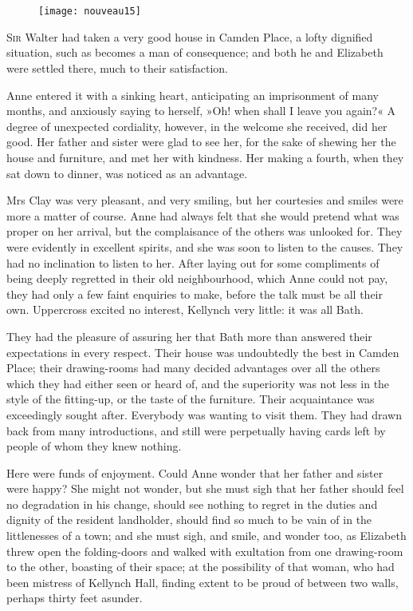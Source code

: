 \chapter[Chapter \thechapter]{}

\begin{figure}[t!]
\centering
\texttt{[image: nouveau15]}
\end{figure}

\lettrine[lines=4,lraise=0.3]{S}{ir} Walter had taken a very good house in Camden Place, a lofty dignified situation, such as becomes a man of consequence; and both he and Elizabeth were settled there, much to their satisfaction.

Anne entered it with a sinking heart, anticipating an imprisonment of many months, and anxiously saying to herself, »Oh! when shall I leave you again?« A degree of unexpected cordiality, however, in the welcome she received, did her good. Her father and sister were glad to see her, for the sake of shewing her the house and furniture, and met her with kindness. Her making a fourth, when they sat down to dinner, was noticed as an advantage.

Mrs Clay was very pleasant, and very smiling, but her courtesies and smiles were more a matter of course. Anne had always felt that she would pretend what was proper on her arrival, but the complaisance of the others was unlooked for. They were evidently in excellent spirits, and she was soon to listen to the causes. They had no inclination to listen to her. After laying out for some compliments of being deeply regretted in their old neighbourhood, which Anne could not pay, they had only a few faint enquiries to make, before the talk must be all their own. Uppercross excited no interest, Kellynch very little: it was all Bath.

They had the pleasure of assuring her that Bath more than answered their expectations in every respect. Their house was undoubtedly the best in Camden Place; their drawing-rooms had many decided advantages over all the others which they had either seen or heard of, and the superiority was not less in the style of the fitting-up, or the taste of the furniture. Their acquaintance was exceedingly sought after. Everybody was wanting to visit them. They had drawn back from many introductions, and still were perpetually having cards left by people of whom they knew nothing.

Here were funds of enjoyment. Could Anne wonder that her father and sister were happy? She might not wonder, but she must sigh that her father should feel no degradation in his change, should see nothing to regret in the duties and dignity of the resident landholder, should find so much to be vain of in the littlenesses of a town; and she must sigh, and smile, and wonder too, as Elizabeth threw open the folding-doors and walked with exultation from one drawing-room to the other, boasting of their space; at the possibility of that woman, who had been mistress of Kellynch Hall, finding extent to be proud of between two walls, perhaps thirty feet asunder.

